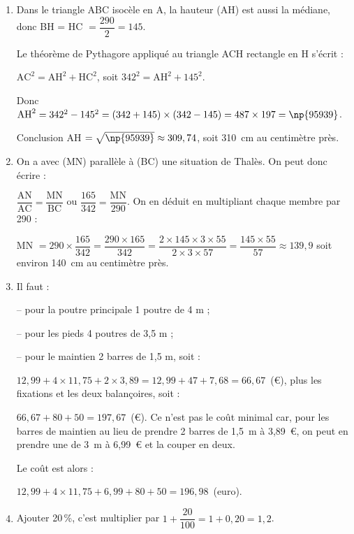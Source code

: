 \begin{enumerate}
\item %
Dans le triangle ABC isocèle en A, la hauteur (AH) est aussi la médiane, donc BH = HC $= \dfrac{290}{2} = 145$.

Le théorème de Pythagore appliqué au triangle ACH rectangle en H s'écrit :

$\text{AC}^2 = \text{AH}^2 + \text{HC}^2$, soit $342^2 = \text{AH}^2 + 145^2$.

Donc $\text{AH}^2 = 342^2 - 145^2 = (342 + 145)\times (342 - 145) = 487 \times 197 = \np{95939}$.

Conclusion AH $ = \sqrt{\np{95939}} \approx 309,74$, soit 310~cm au centimètre près.
\item %
On a avec (MN) parallèle à (BC) une situation de Thalès. On peut donc écrire :

$\dfrac{\text{AN}}{\text{AC}} = \dfrac{\text{MN}}{\text{BC}}$ ou $\dfrac{165}{342} = \dfrac{\text{MN}}{290}$. On en déduit en multipliant chaque membre par 290 :

MN $ = 290 \times \dfrac{165}{342} = \dfrac{290 \times 165}{342} = \dfrac{2 \times 145 \times 3 \times 55}{2 \times 3 \times 57} = \dfrac{145 \times 55}{57} \approx 139,9$ soit environ 140~cm au centimètre près.
\item %
Il faut :

-- pour la poutre principale 1 poutre de 4 m ;

-- pour les pieds 4 poutres de 3,5 m ;

-- pour le maintien 2 barres de 1,5 m, soit :

$12,99 + 4 \times 11,75 + 2 \times 3,89 = 12,99 + 47 + 7,68 = 66,67$~(\euro), plus les fixations et les deux balançoires, soit :

$66,67 + 80 + 50 = 197,67$~(\euro).
Ce n'est pas le coût minimal car, pour les barres de maintien au lieu de prendre 2 barres de 1,5~m à 3,89~\euro{}, on peut en prendre une de 3~m à 6,99~\euro{} et la couper en deux.

Le coût est alors : 

$12,99 + 4 \times 11,75 +  6,99 + 80 + 50 = 196,98$~(euro).
\item %
Ajouter 20\,\%, c'est multiplier par $1 + \dfrac{20}{100} = 1 + 0,20 = 1,2$.


\end{enumerate}
